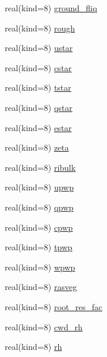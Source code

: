 \begin{DoxyCompactItemize}
\item 
real(kind=8) \hyperlink{structrk4__coms_1_1rk4patchtype_a79fa840034bb0dc634bf5da59e7781b4}{ground\+\_\+fliq}
\item 
real(kind=8) \hyperlink{structrk4__coms_1_1rk4patchtype_a1f94e5b927bcab29c1ccdbbed961e4e7}{rough}
\item 
real(kind=8) \hyperlink{structrk4__coms_1_1rk4patchtype_addee268d5b9c976cf30d30119139e43c}{ustar}
\item 
real(kind=8) \hyperlink{structrk4__coms_1_1rk4patchtype_a0a51b67e508c71ad1bfe7cc0ec03ab50}{cstar}
\item 
real(kind=8) \hyperlink{structrk4__coms_1_1rk4patchtype_aa04cf4934b3afc88b7ca69dd5e42f4b0}{tstar}
\item 
real(kind=8) \hyperlink{structrk4__coms_1_1rk4patchtype_ab0225e75d23a22130cb9540c47769c19}{qstar}
\item 
real(kind=8) \hyperlink{structrk4__coms_1_1rk4patchtype_a5b902545c66d5bf39b0d908a5bf03eac}{estar}
\item 
real(kind=8) \hyperlink{structrk4__coms_1_1rk4patchtype_a35665ce92058b1d6f19447a08fd3b29f}{zeta}
\item 
real(kind=8) \hyperlink{structrk4__coms_1_1rk4patchtype_a1ba554dc22adc93bec84be40c87f93a7}{ribulk}
\item 
real(kind=8) \hyperlink{structrk4__coms_1_1rk4patchtype_aa345336eb00baa09e2f52f22001af7e3}{upwp}
\item 
real(kind=8) \hyperlink{structrk4__coms_1_1rk4patchtype_ac2f49823d9a5349f98a8912cbee0f838}{qpwp}
\item 
real(kind=8) \hyperlink{structrk4__coms_1_1rk4patchtype_a70eda468a5a061c5465e13483a1cb415}{cpwp}
\item 
real(kind=8) \hyperlink{structrk4__coms_1_1rk4patchtype_aabf358cc125a37721310b66fb1419d83}{tpwp}
\item 
real(kind=8) \hyperlink{structrk4__coms_1_1rk4patchtype_a91728bf053cbc9d1a5e1b0d4e6624b64}{wpwp}
\item 
real(kind=8) \hyperlink{structrk4__coms_1_1rk4patchtype_a3c1cfc91405c8ea9033a5978cb9fcc24}{rasveg}
\item 
real(kind=8) \hyperlink{structrk4__coms_1_1rk4patchtype_ac5ef1027d0c6d201ebfa3d7730a1d5f8}{root\+\_\+res\+\_\+fac}
\item 
real(kind=8) \hyperlink{structrk4__coms_1_1rk4patchtype_a6bb29c5eb04399802419b9b8aca23b74}{cwd\+\_\+rh}
\item 
real(kind=8) \hyperlink{structrk4__coms_1_1rk4patchtype_a00fd046c624cfb355879a826ce1f9dd7}{rh}

\end{DoxyCompactItemize}
